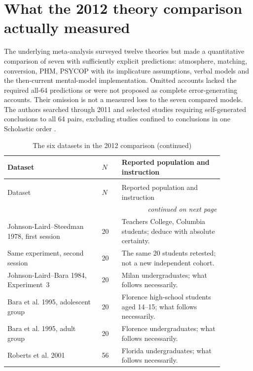 \section{What the 2012 theory comparison actually measured}
\label{sec:p19-r33-meta}

The underlying meta-analysis surveyed twelve theories but made a quantitative
comparison of seven with sufficiently explicit predictions: atmosphere,
matching, conversion, PHM, PSYCOP with its implicature assumptions, verbal
models and the then-current mental-model implementation. Omitted accounts
lacked the required all-64 predictions or were not proposed as complete
error-generating accounts. Their omission is not a measured loss to the
seven compared models. The authors searched through 2011 and selected
studies requiring self-generated conclusions to all 64 pairs, excluding
studies confined to conclusions in one Scholastic order
\cite[pp.~19--21 of the advance-online text]
{KhemlaniJohnsonLaird2012SyllogismMeta}.

\begin{longtable}{@{}p{0.38\linewidth}p{0.08\linewidth}p{0.41\linewidth}@{}}
\caption{The six datasets in the 2012 comparison}\label{tab:p19-r33-meta-samples}\\
\hline
Dataset & \(N\) & Reported population and instruction \\
\hline
\endfirsthead
\caption[]{The six datasets in the 2012 comparison (continued)}\\
\hline Dataset & \(N\) & Reported population and instruction \\
\hline
\endhead
\hline\multicolumn{3}{r}{\emph{continued on next page}}\\
\endfoot
\endlastfoot
Johnson-Laird--Steedman 1978, first session & 20 & Teachers College,
Columbia students; deduce with absolute certainty. \\
Same experiment, second session & 20 & The same 20 students retested;
not a new independent cohort. \\
Johnson-Laird--Bara 1984, Experiment~3 & 20 & Milan undergraduates;
what follows necessarily. \\
Bara et al. 1995, adolescent group & 20 & Florence high-school students
aged 14--15; what follows necessarily. \\
Bara et al. 1995, adult group & 20 & Florence undergraduates;
what follows necessarily. \\
Roberts et al. 2001 & 56 & Florida undergraduates;
what follows necessarily. \\
\hline
\end{longtable}

